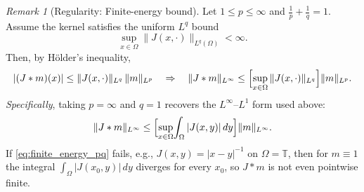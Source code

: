 \documentclass[11pt,a4paper]{article}
\theoremstyle{plain}
\theoremstyle{definition}
\theoremstyle{remark}
\newtheorem{remark}[theorem]{Remark}
\begin{document}
\begin{remark}[Regularity: Finite-energy bound]
	Let $1\le p\le\infty$ and $\tfrac1p+\tfrac1q=1$.
	Assume the kernel satisfies the uniform $L^q$ bound
	\begin{equation}\label{eq:finite_energy_pq}
		\sup_{x\in\Omega}\|J(x,\cdot)\|_{L^q(\Omega)}<\infty .
	\end{equation}
	Then, by Hölder’s inequality,
	\[
		|(J*m)(x)|
		\le \|J(x,\cdot)\|_{L^q}\,\|m\|_{L^p}
		\quad\Rightarrow\quad
		\|J*m\|_{L^\infty}
		\le \Bigl[\sup_{x\in\Omega}\|J(x,\cdot)\|_{L^q}\Bigr]\|m\|_{L^p}.
	\]
	\textit{Specifically}, taking $p=\infty$ and $q=1$ recovers the $L^\infty$–$L^1$
	form used above:
	\[
		\|J*m\|_{L^\infty}
		\le \Bigl[\sup_{x\in\Omega}\!\int_\Omega |J(x,y)|\,dy\Bigr]\|m\|_{L^\infty}.
	\]
	If \eqref{eq:finite_energy_pq} fails, e.g., $J(x,y)=|x-y|^{-1}$ on $\Omega=\mathbb{T}$, then
	for $m\equiv1$ the integral $\int_\Omega |J(x_0,y)|\,dy$ diverges for every
	$x_0$, so $J*m$ is not even pointwise finite.
\end{remark}
\end{document}
